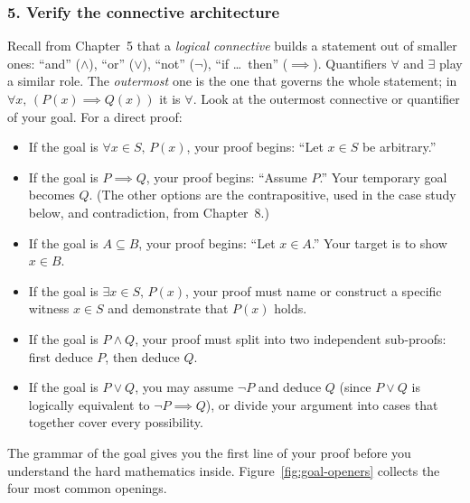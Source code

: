 \subsubsection{5. Verify the connective architecture}
Recall from Chapter~5 that a \emph{logical connective} builds a statement out of smaller ones: ``and'' ($\land$), ``or'' ($\lor$), ``not'' ($\neg$), ``if \ldots\ then'' ($\implies$). Quantifiers $\forall$ and $\exists$ play a similar role. The \emph{outermost} one is the one that governs the whole statement; in $\forall x, \, (P(x) \implies Q(x))$ it is $\forall$. Look at the outermost connective or quantifier of your goal. For a direct proof:
\begin{itemize}
\item If the goal is $\forall x \in S, \, P(x)$, your proof begins: ``Let $x \in S$ be arbitrary.''
\item If the goal is $P \implies Q$, your proof begins: ``Assume $P$.'' Your temporary goal becomes $Q$. (The other options are the contrapositive, used in the case study below, and contradiction, from Chapter~8.)
\item If the goal is $A \subseteq B$, your proof begins: ``Let $x \in A$.'' Your target is to show $x \in B$.
\item If the goal is $\exists x \in S, \, P(x)$, your proof must name or construct a specific witness $x \in S$ and demonstrate that $P(x)$ holds.
\item If the goal is $P \land Q$, your proof must split into two independent sub-proofs: first deduce $P$, then deduce $Q$.
\item If the goal is $P \lor Q$, you may assume $\neg P$ and deduce $Q$ (since $P \lor Q$ is logically equivalent to $\neg P \implies Q$), or divide your argument into cases that together cover every possibility.
\end{itemize}
The grammar of the goal gives you the first line of your proof before you understand the hard mathematics inside. Figure~\ref{fig:goal-openers} collects the four most common openings.

